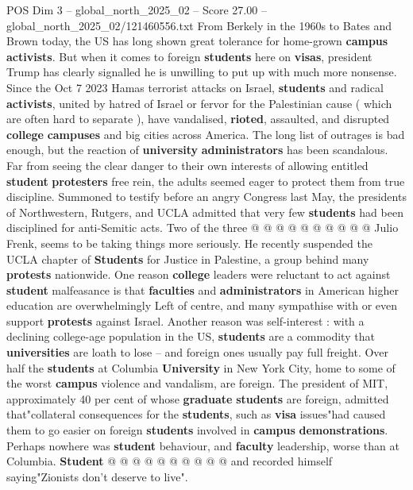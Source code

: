 \begin{textsample}{POS Dim 3 – global\_north\_2025\_02 – Score 27.00 – global\_north\_2025\_02/121460556.txt}  \label{ex:f3_pos_289}
From Berkely in the 1960s to Bates and Brown today, the US has long shown great tolerance for home-grown \textbf{campus} \textbf{activists}.
But when it comes to foreign \textbf{students} here on \textbf{visas}, president Trump has clearly signalled he is unwilling to put up with much more nonsense.
Since the Oct 7 2023 Hamas terrorist attacks on Israel, \textbf{students} and radical \textbf{activists}, united by hatred of Israel or fervor for the Palestinian cause ( which are often hard to separate ), have vandalised, \textbf{rioted}, assaulted, and disrupted \textbf{college} \textbf{campuses} and big cities across America.
The long list of outrages is bad enough, but the reaction of \textbf{university} \textbf{administrators} has been scandalous.
Far from seeing the clear danger to their own interests of allowing entitled \textbf{student} \textbf{protesters} free rein, the adults seemed eager to protect them from true discipline.
Summoned to testify before an angry Congress last May, the presidents of Northwestern, Rutgers, and UCLA admitted that very few \textbf{students} had been disciplined for anti-Semitic acts.
Two of the three @ @ @ @ @ @ @ @ @ @ Julio Frenk, seems to be taking things more seriously.
He recently suspended the UCLA chapter of \textbf{Students} for Justice in Palestine, a group behind many \textbf{protests} nationwide.
One reason \textbf{college} leaders were reluctant to act against \textbf{student} malfeasance is that \textbf{faculties} and \textbf{administrators} in American higher education are overwhelmingly Left of centre, and many sympathise with or even support \textbf{protests} against Israel.
Another reason was self-interest : with a declining college-age population in the US, \textbf{students} are a commodity that \textbf{universities} are loath to lose -- and foreign ones usually pay full freight.
Over half the \textbf{students} at Columbia \textbf{University} in New York City, home to some of the worst \textbf{campus} violence and vandalism, are foreign.
The president of MIT, approximately 40 per cent of whose \textbf{graduate} \textbf{students} are foreign, admitted that"collateral consequences for the \textbf{students}, such as \textbf{visa} issues"had caused them to go easier on foreign \textbf{students} involved in \textbf{campus} \textbf{demonstrations}.
Perhaps nowhere was \textbf{student} behaviour, and \textbf{faculty} leadership, worse than at Columbia. \textbf{Student} @ @ @ @ @ @ @ @ @ @ and recorded himself saying"Zionists don't deserve to live".

\end{textsample}

